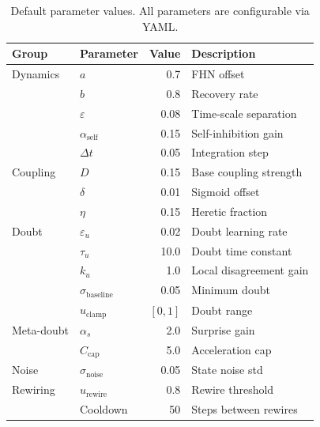 ﻿\documentclass[11pt]{article}
\begin{document}
\begin{table}[ht]
\centering
\caption{Default parameter values. All parameters are configurable via YAML.}
\begin{tabular}{llrl}
\toprule
\textbf{Group} & \textbf{Parameter} & \textbf{Value} & \textbf{Description} \\
\midrule
Dynamics & $a$ & 0.7 & FHN offset \\
         & $b$ & 0.8 & Recovery rate \\
         & $\varepsilon$ & 0.08 & Time-scale separation \\
         & $\alpha_{\text{self}}$ & 0.15 & Self-inhibition gain \\
         & $\Delta t$ & 0.05 & Integration step \\
\midrule
Coupling & $D$ & 0.15 & Base coupling strength \\
         & $\delta$ & 0.01 & Sigmoid offset \\
         & $\eta$ & 0.15 & Heretic fraction \\
\midrule
Doubt    & $\varepsilon_u$ & 0.02 & Doubt learning rate \\
         & $\tau_u$ & 10.0 & Doubt time constant \\
         & $k_u$ & 1.0 & Local disagreement gain \\
         & $\sigma_{\text{baseline}}$ & 0.05 & Minimum doubt \\
         & $u_{\text{clamp}}$ & $[0, 1]$ & Doubt range \\
\midrule
Meta-doubt & $\alpha_s$ & 2.0 & Surprise gain \\
           & $C_{\text{cap}}$ & 5.0 & Acceleration cap \\
\midrule
Noise    & $\sigma_{\text{noise}}$ & 0.05 & State noise std \\
\midrule
Rewiring & $u_{\text{rewire}}$ & 0.8 & Rewire threshold \\
         & Cooldown & 50 & Steps between rewires \\
\bottomrule
\end{tabular}
\end{table}
\end{document}
